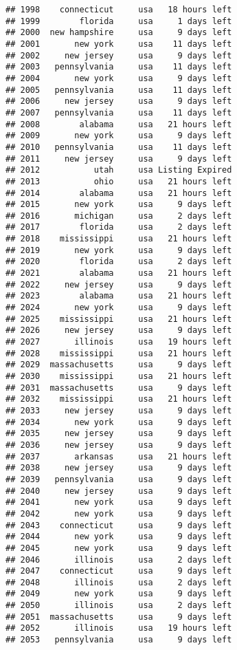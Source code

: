 \documentclass[
]{article}
\begin{document}
\begin{verbatim}
## 1998    connecticut     usa   18 hours left
## 1999        florida     usa     1 days left
## 2000  new hampshire     usa     9 days left
## 2001       new york     usa    11 days left
## 2002     new jersey     usa     9 days left
## 2003   pennsylvania     usa    11 days left
## 2004       new york     usa     9 days left
## 2005   pennsylvania     usa    11 days left
## 2006     new jersey     usa     9 days left
## 2007   pennsylvania     usa    11 days left
## 2008        alabama     usa   21 hours left
## 2009       new york     usa     9 days left
## 2010   pennsylvania     usa    11 days left
## 2011     new jersey     usa     9 days left
## 2012           utah     usa Listing Expired
## 2013           ohio     usa   21 hours left
## 2014        alabama     usa   21 hours left
## 2015       new york     usa     9 days left
## 2016       michigan     usa     2 days left
## 2017        florida     usa     2 days left
## 2018    mississippi     usa   21 hours left
## 2019       new york     usa     9 days left
## 2020        florida     usa     2 days left
## 2021        alabama     usa   21 hours left
## 2022     new jersey     usa     9 days left
## 2023        alabama     usa   21 hours left
## 2024       new york     usa     9 days left
## 2025    mississippi     usa   21 hours left
## 2026     new jersey     usa     9 days left
## 2027       illinois     usa   19 hours left
## 2028    mississippi     usa   21 hours left
## 2029  massachusetts     usa     9 days left
## 2030    mississippi     usa   21 hours left
## 2031  massachusetts     usa     9 days left
## 2032    mississippi     usa   21 hours left
## 2033     new jersey     usa     9 days left
## 2034       new york     usa     9 days left
## 2035     new jersey     usa     9 days left
## 2036     new jersey     usa     9 days left
## 2037       arkansas     usa   21 hours left
## 2038     new jersey     usa     9 days left
## 2039   pennsylvania     usa     9 days left
## 2040     new jersey     usa     9 days left
## 2041       new york     usa     9 days left
## 2042       new york     usa     9 days left
## 2043    connecticut     usa     9 days left
## 2044       new york     usa     9 days left
## 2045       new york     usa     9 days left
## 2046       illinois     usa     2 days left
## 2047    connecticut     usa     9 days left
## 2048       illinois     usa     2 days left
## 2049       new york     usa     9 days left
## 2050       illinois     usa     2 days left
## 2051  massachusetts     usa     9 days left
## 2052       illinois     usa   19 hours left
## 2053   pennsylvania     usa     9 days left

\end{verbatim}
\end{document}
